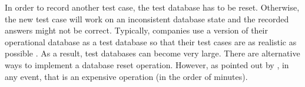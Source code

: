 \documentclass[authoryear,preprint,12pt]{elsarticle}
\begin{document}
In order to record another test case, the test database has to be reset.  
Otherwise, the new test case will work on an inconsistent database state and the recorded answers might not be correct.  
Typically, companies use a version of their operational database as a test database so that their test cases
are as realistic as possible \cite{cidr05}.  As a result, test databases can become very large.
There are alternative ways to implement a database reset operation.
However, as pointed out by \cite{cidr05}, in any event, that is an expensive operation (in the order of minutes).


    
\end{document}
